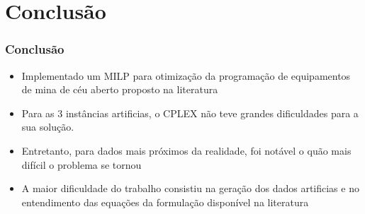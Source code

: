 \documentclass{beamer}
\begin{document}


\section{Conclusão}
\begin{frame}
	\frametitle{Conclusão}
	\begin{itemize}
		\item Implementado um MILP para otimização da programação de equipamentos de mina de céu aberto proposto na literatura \cite{topal2010a}
		\item Para as 3 instâncias artificias, o CPLEX não teve grandes dificuldades para a sua solução. 
		\item Entretanto, para dados mais próximos da realidade, foi notável o quão mais difícil o problema se tornou
		\item A maior dificuldade do trabalho consistiu na geração dos dados artificias e no entendimento das equações da formulação disponível na literatura
	\end{itemize}
\end{frame}



%
%
%
%
%
%
%
\end{document}
